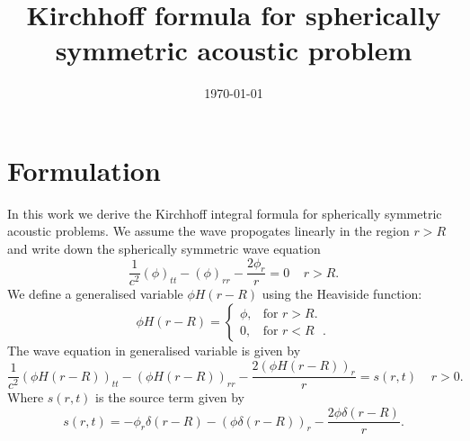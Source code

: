 \documentclass[a4paper]{article}
\title{Kirchhoff formula for spherically symmetric acoustic problem}
\author{}
\date{\today}
\begin{document}
\maketitle
\section*{Formulation}
\begin{figure}[h!]\label{schematic}
    \centering
\end{figure}
In this work we derive the Kirchhoff integral formula for spherically symmetric acoustic problems. We assume the wave propogates linearly in the region $r > R$ and write down the spherically symmetric wave equation
\begin{equation}\label{wave}
    \frac{1}{c^2}(\phi)_{tt} - (\phi)_{rr} - \frac{2\phi_r}{r} = 0 \;\;\;\; r > R.
\end{equation}
We define a generalised variable $\phi H(r - R)$ using the Heaviside function:
\begin{equation}
	\phi H(r - R) =\begin{cases}
	\phi , & \text{for $r > R$}.\\
	0, & \text{for $r < R$ }.
	\end{cases}
\end{equation}
The wave equation in generalised variable is given by
\begin{equation}\label{generalised_wave}
    \frac{1}{c^2}(\phi H(r - R))_{tt} - (\phi H(r - R))_{rr} - \frac{2(\phi H(r - R))_r}{r} = s(r, t) \;\;\;\; r > 0.
\end{equation}
Where $s(r, t)$ is the source term given by
\begin{equation}
    s(r,t) = - \phi_{r}\delta(r - R) - (\phi \delta (r - R))_r - \frac{2\phi \delta(r - R)}{r}.
\end{equation}
\end{document}
